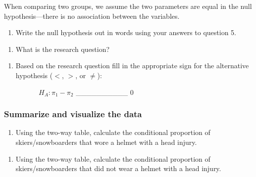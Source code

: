 \documentclass[
]{report}
\providecommand{\tightlist}{%
  \setlength{\itemsep}{0pt}\setlength{\parskip}{0pt}}
\begin{document}
When comparing two groups, we assume the two parameters are equal in the null hypothesis---there is no association between the variables.

\begin{enumerate}
\def\labelenumi{\arabic{enumi}.}
\setcounter{enumi}{5}
\tightlist
\item
  Write the null hypothesis out in words using your answers to question 5.
\end{enumerate}

\vspace{0.81in}

\begin{enumerate}
\def\labelenumi{\arabic{enumi}.}
\setcounter{enumi}{6}
\tightlist
\item
  What is the research question?
\end{enumerate}

\vspace{0.5in}

\begin{enumerate}
\def\labelenumi{\arabic{enumi}.}
\setcounter{enumi}{7}
\tightlist
\item
  Based on the research question fill in the appropriate sign for the alternative hypothesis (\(<\), \(>\), or \(\neq\)):
  \vspace{0.25in}
\end{enumerate}

~~~~~~~~~~\(H_A: \pi_1 -\pi_2\) \_\_\_\_\_\_\_\_\_\_ 0

\newpage

\hypertarget{summarize-and-visualize-the-data-1}{%
\subsubsection*{Summarize and visualize the data}\label{summarize-and-visualize-the-data-1}}

\begin{enumerate}
\def\labelenumi{\arabic{enumi}.}
\setcounter{enumi}{8}
\tightlist
\item
  Using the two-way table, calculate the conditional proportion of skiers/snowboarders that wore a helmet with a head injury.
\end{enumerate}

\vspace{.3in}

\begin{enumerate}
\def\labelenumi{\arabic{enumi}.}
\setcounter{enumi}{9}
\tightlist
\item
  Using the two-way table, calculate the conditional proportion of skiers/snowboarders that did not wear a helmet with a head injury.
\end{enumerate}
\end{document}
